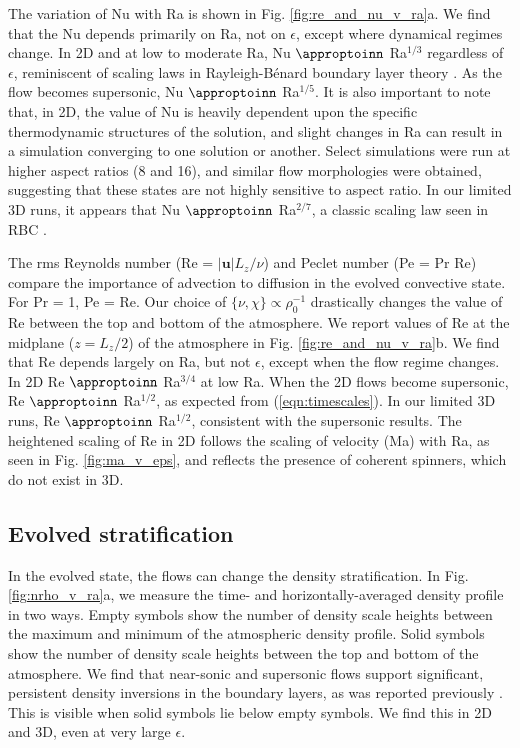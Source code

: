 \documentclass[aps, pre, onecolumn, nofootinbib, notitlepage, groupedaddress, amsfonts, amssymb, amsmath, longbibliography]{revtex4-1}
\newcommand{\RB}{Rayleigh-B\'{e}nard }
\newcommand{\approptoinn}[2]{\mathrel{\vcenter{
	\offinterlineskip\halign{\hfil$##$\cr
	#1\propto\cr\noalign{\kern2pt}#1\sim\cr\noalign{\kern-2pt}}}}}
\newcommand{\appropto}{\mathpalette\approptoinn\relax}
\begin{document}
The variation of Nu with Ra is shown in 
Fig. \ref{fig:re_and_nu_v_ra}a.  We find that the Nu depends primarily
on Ra, not on $\epsilon$, except where dynamical regimes change.
In 2D and at low to moderate Ra, 
Nu $\appropto$ Ra$^{1/3}$ regardless of $\epsilon$,
reminiscent of scaling laws in \RB boundary layer theory 
\cite{grossman&lohse2000, ahlers&all2009, king&all2012}.
As the flow becomes supersonic,  Nu $\appropto$ Ra$^{1/5}$.
It is also important to note that, in 2D,
the value of Nu is heavily dependent upon the specific thermodynamic
structures of the solution, and slight changes in
Ra can result in a simulation converging to one solution or another. 
Select simulations were run at higher aspect ratios (8 and 16), and similar flow
morphologies were obtained, suggesting that these states are not highly
sensitive to aspect ratio.
In our limited 3D runs, it appears that Nu $\appropto$ Ra$^{2/7}$, a classic scaling law
seen in RBC \cite{johnston&doering2009}.

The rms Reynolds number (Re = $|\bm{u}|L_z/\nu$) and Peclet number
(Pe = Pr Re)
compare the importance of advection to diffusion in the evolved
convective state.  For Pr = 1, Pe = Re.  
Our choice of $\{\nu,\chi\}\propto \rho_0^{-1}$ drastically changes
the value of Re between the top and bottom of the atmosphere.  We report values of
Re at the midplane ($z=L_z/2$) of the atmosphere in
Fig. \ref{fig:re_and_nu_v_ra}b.  We find that Re
depends largely on Ra, but not $\epsilon$, except when the flow regime
changes.
In 2D Re $\appropto$ Ra$^{3/4}$ at low Ra.    When the 2D flows
become supersonic, 
Re $\appropto$ Ra$^{1/2}$, as expected
from (\ref{eqn:timescales}).
In our limited 3D runs,
Re $\appropto$ Ra$^{1/2}$, consistent with the supersonic results.
The heightened scaling
of Re in 2D follows the scaling of velocity (Ma) with Ra, as
seen in Fig. \ref{fig:ma_v_eps}, and reflects the presence of coherent
spinners, which do not exist in 3D.

\vspace{-0.5cm}
\subsection{Evolved stratification}

In the evolved state, the flows can change the density stratification.
In Fig. \ref{fig:nrho_v_ra}a, we measure the 
time- and horizontally-averaged density profile in two ways. Empty symbols
show the number of density scale heights between the maximum and minimum of the
atmospheric density profile.  Solid symbols
show the number of density scale heights between the top and bottom of the atmosphere. 
We find that near-sonic and supersonic flows support significant, 
persistent density inversions in the boundary layers, as
was reported previously \cite{brandenburg&all2005}.  This is visible when
solid symbols lie below empty symbols.  We find this in 2D and 3D, even
at very large $\epsilon$.  
\end{document}
